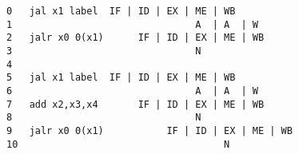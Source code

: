 \documentclass[varwidth]{standalone}
\begin{document}
  \begin{BVerbatim}[]
0   jal x1 label  IF | ID | EX | ME | WB
1                                A  | A  | W
2   jalr x0 0(x1)      IF | ID | EX | ME | WB
3                                N
4
5   jal x1 label  IF | ID | EX | ME | WB
6                                A  | A  | W
7   add x2,x3,x4       IF | ID | EX | ME | WB
8                                N
9   jalr x0 0(x1)           IF | ID | EX | ME | WB
10                                    N
  \end{BVerbatim}
\end{document}
